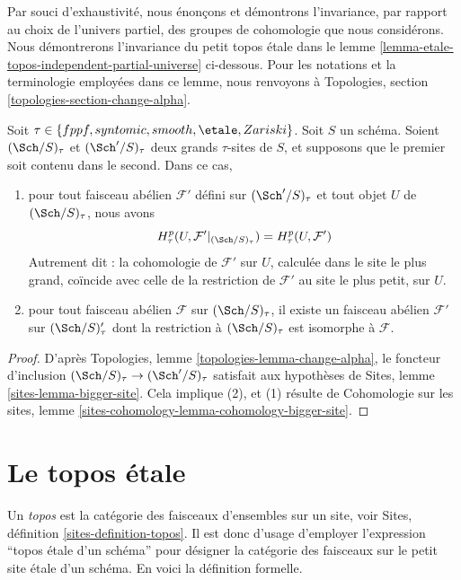 \noindent
Par souci d'exhaustivit\'e, nous \'enon\c{c}ons et d\'emontrons l'invariance, par rapport au choix de l'univers
partiel, des groupes de cohomologie que nous consid\'erons. Nous d\'emontrerons l'invariance
du petit topos \'etale dans le
lemme \ref{lemma-etale-topos-independent-partial-universe} ci-dessous.
Pour les notations et la terminologie employ\'ees dans ce lemme, nous renvoyons \`a
Topologies, section \ref{topologies-section-change-alpha}.

\begin{lemma}
\label{lemma-cohomology-enlarge-partial-universe}
Soit $\tau \in \{fppf, syntomic, smooth, \etale, Zariski\}$.
Soit $S$ un sch\'ema.
Soient $(\Sch/S)_\tau$ et $(\Sch'/S)_\tau$ deux
grands $\tau$-sites de $S$, et supposons que le premier soit contenu dans le second.
Dans ce cas,
\begin{enumerate}
\item pour tout faisceau ab\'elien $\mathcal{F}'$ d\'efini sur $(\Sch'/S)_\tau$ et
tout objet $U$ de $(\Sch/S)_\tau$, nous avons
$$
H^p_\tau(U, \mathcal{F}'|_{(\Sch/S)_\tau}) =
H^p_\tau(U, \mathcal{F}')
$$
Autrement dit : la cohomologie de $\mathcal{F}'$ sur $U$, calcul\'ee dans le site le plus grand,
co\"incide avec celle de la restriction de $\mathcal{F}'$ au site le plus petit,
sur $U$.
\item pour tout faisceau ab\'elien $\mathcal{F}$ sur $(\Sch/S)_\tau$, il existe un
faisceau ab\'elien $\mathcal{F}'$ sur $(\Sch/S)_\tau'$ dont la restriction \`a
$(\Sch/S)_\tau$ est isomorphe \`a $\mathcal{F}$.
\end{enumerate}
\end{lemma}

\begin{proof}
D'apr\`es Topologies, lemme \ref{topologies-lemma-change-alpha}, le foncteur d'inclusion
$(\Sch/S)_\tau \to (\Sch'/S)_\tau$ satisfait aux hypoth\`eses de
Sites, lemme \ref{sites-lemma-bigger-site}. Cela implique (2), et (1)
r\'esulte de
Cohomologie sur les sites, lemme \ref{sites-cohomology-lemma-cohomology-bigger-site}.
\end{proof}




\section{Le topos \'etale}
\label{section-etale-topos}

\noindent
Un {\it topos} est la cat\'egorie des faisceaux d'ensembles sur un site, voir
Sites, définition \ref{sites-definition-topos}. Il est donc d'usage
d'employer l'expression ``topos \'etale d'un sch\'ema'' pour d\'esigner
la cat\'egorie des faisceaux sur le petit site \'etale d'un sch\'ema.
En voici la d\'efinition formelle.

